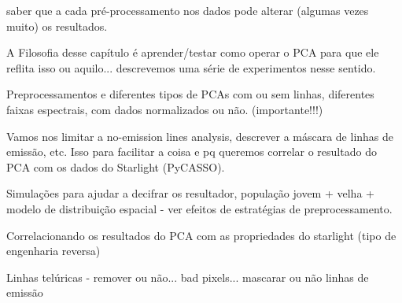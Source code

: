  saber que a cada
pré-processamento nos dados pode alterar (algumas vezes muito) os resultados.





\ojo A Filosofia desse capítulo é aprender/testar
como operar o PCA para que ele reflita isso ou aquilo... descrevemos uma série
de experimentos nesse sentido.

Preprocessamentos e diferentes tipos de PCAs com ou sem linhas, diferentes 
faixas espectrais, com dados normalizados ou não. (importante!!!)

Vamos nos limitar a no-emission lines analysis, descrever a máscara de linhas 
de emissão, etc. Isso para facilitar a coisa e pq queremos correlar o 
resultado do PCA com os dados do Starlight (PyCASSO).

Simulações para ajudar a decifrar os resultador, população jovem + velha + 
modelo de distribuição espacial - ver efeitos de estratégias de 
preprocessamento.

Correlacionando os resultados do PCA com as propriedades do starlight (tipo de 
engenharia reversa)

Linhas telúricas - remover ou não... bad pixels... mascarar ou não linhas de 
emissão